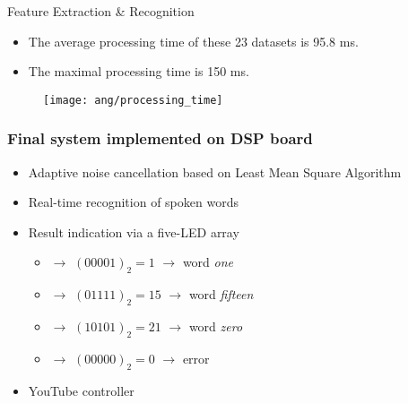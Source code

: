 \begin{frame}
Feature Extraction \& Recognition
\begin{itemize}
\item The average processing time of these 23 datasets is 95.8 ms.
\item The maximal processing time is 150 ms.
\end{itemize}

\begin{figure}[H]
\centering
\texttt{[image: ang/processing\_time]}
\end{figure}
\end{frame}


\begin{frame}
\frametitle{Final system implemented on DSP board}
\begin{itemize}
	\item Adaptive noise cancellation based on Least Mean Square Algorithm
	\item Real-time recognition of spoken words
	\item Result indication via a five-LED array
		\begin{itemize}
		\item \LED\offLED\offLED\offLED\offLED\onLED $\longrightarrow$ $(00001)_2 = 1$ $\longrightarrow$ word \textit{one}
		\item \LED\offLED\onLED\onLED\onLED\onLED $\longrightarrow$ $(01111)_2 = 15$ $\longrightarrow$ word \textit{fifteen}
		\item \LED\onLED\offLED\onLED\offLED\onLED $\longrightarrow$ $(10101)_2 = 21$ $\longrightarrow$ word \textit{zero}
		\item \LED\offLED\offLED\offLED\offLED\offLED $\longrightarrow$ $(00000)_2 = 0$ $\longrightarrow$ error
		\end{itemize}
	\item YouTube controller
\end{itemize}
\end{frame}
